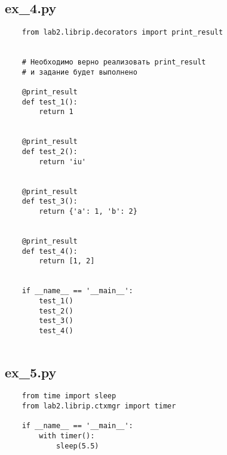 \documentclass{article}
\begin{document}
\subsection{ex\_4.py}
\begin{verbatim}
    from lab2.librip.decorators import print_result


    # Необходимо верно реализовать print_result
    # и задание будет выполнено
    
    @print_result
    def test_1():
        return 1
    
    
    @print_result
    def test_2():
        return 'iu'
    
    
    @print_result
    def test_3():
        return {'a': 1, 'b': 2}
    
    
    @print_result
    def test_4():
        return [1, 2]
    
    
    if __name__ == '__main__':
        test_1()
        test_2()
        test_3()
        test_4()
        
\end{verbatim}
\subsection{ex\_5.py}
\begin{verbatim}
    from time import sleep
    from lab2.librip.ctxmgr import timer
    
    if __name__ == '__main__':
        with timer():
            sleep(5.5)    
\end{verbatim}
\end{document}
